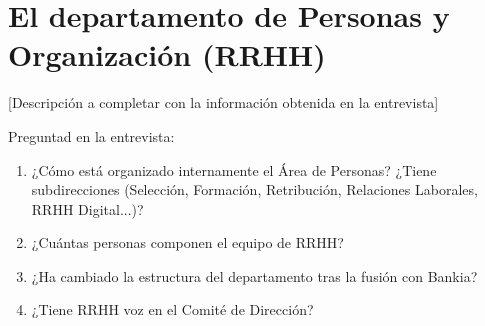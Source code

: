 \section{El departamento de Personas y Organización (RRHH)}


[Descripción a completar con la información obtenida en la entrevista]

\begin{notaequipo}
  Preguntad en la entrevista:
  \begin{enumerate}
    \item ¿Cómo está organizado internamente el Área de Personas?
          ¿Tiene subdirecciones (Selección, Formación, Retribución,
          Relaciones Laborales, RRHH Digital...)?
    \item ¿Cuántas personas componen el equipo de RRHH?
    \item ¿Ha cambiado la estructura del departamento tras la fusión
          con Bankia?
    \item ¿Tiene RRHH voz en el Comité de Dirección?
  \end{enumerate}
\end{notaequipo}
